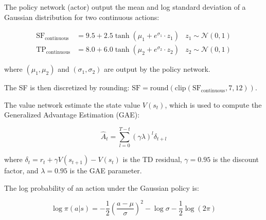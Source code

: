 \documentclass[12pt,a4paper]{article}
\begin{document}

The policy network (actor) output the mean and log standard deviation of a Gaussian distribution for two continuous actions:

\begin{align}
    \text{SF}_{\text{continuous}} &= 9.5 + 2.5 \tanh(\mu_1 + e^{\sigma_1} \cdot z_1) & z_1 \sim \mathcal{N}(0,1) \\
    \text{TP}_{\text{continuous}} &= 8.0 + 6.0 \tanh(\mu_2 + e^{\sigma_2} \cdot z_2) & z_2 \sim \mathcal{N}(0,1)
\end{align}

where $(\mu_1, \mu_2)$ and $(\sigma_1, \sigma_2)$ are output by the policy network.

The SF is then discretized by rounding: $\text{SF} = \text{round}(\text{clip}(\text{SF}_{\text{continuous}}, 7, 12))$.


The value network estimate the state value $V(s_t)$, which is used to compute the Generalized Advantage Estimation (GAE):

\begin{equation}
    \hat{A}_t = \sum_{l=0}^{T-t} (\gamma \lambda)^l \delta_{t+l}
    \label{eq:gae}
\end{equation}

where $\delta_t = r_t + \gamma V(s_{t+1}) - V(s_t)$ is the TD residual, $\gamma = 0.95$ is the discount factor, and $\lambda = 0.95$ is the GAE parameter.


The log probability of an action under the Gaussian policy is:

\begin{equation}
    \log \pi(a|s) = -\frac{1}{2}\left(\frac{a - \mu}{\sigma}\right)^2 - \log\sigma - \frac{1}{2}\log(2\pi)
    \label{eq:log_prob}
\end{equation}
\end{document}

